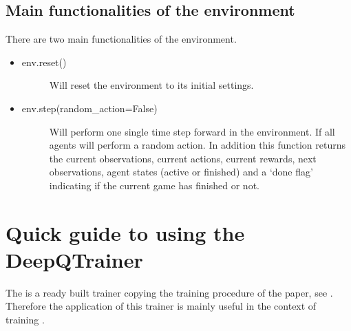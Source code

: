 \documentclass[letterpaper,10pt,english]{sphinxmanual}
\begin{document}
\section{Main functionalities of the environment}
\label{\detokenize{UsingTheEnvironment:main-functionalities-of-the-environment}}
\sphinxAtStartPar
There are two main functionalities of the environment.
\begin{itemize}
\item {} \begin{description}
\item[{env.reset()}] \leavevmode
\sphinxAtStartPar
Will reset the environment to its initial settings.

\end{description}

\item {} \begin{description}
\item[{env.step(random\_action=False)}] \leavevmode
\sphinxAtStartPar
Will perform one single time step forward in the environment. If  all agents will perform a
random action. In addition this function returns the current observations, current actions, current rewards,
next observations, agent states (active or finished) and a ‘done flag’ indicating if the current game has finished
or not.

\end{description}

\end{itemize}


\chapter{Quick guide to using the DeepQTrainer}
\label{\detokenize{UsingTheEnvironment:quick-guide-to-using-the-deepqtrainer}}
\sphinxAtStartPar
The  is a ready built trainer copying the training procedure of the  paper, see  .
Therefore the application of this trainer is mainly useful in the context of training .
\end{document}
